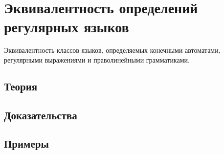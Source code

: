
\section{Эквивалентность определений регулярных языков}
\label{sec:2.3a.08-regular-equivalence}

\begin{ticket}
Эквивалентность классов языков, определяемых конечными автоматами, регулярными выражениями и праволинейными грамматиками.
\end{ticket}

\subsection*{Теория}

\subsection*{Доказательства}

\subsection*{Примеры}
